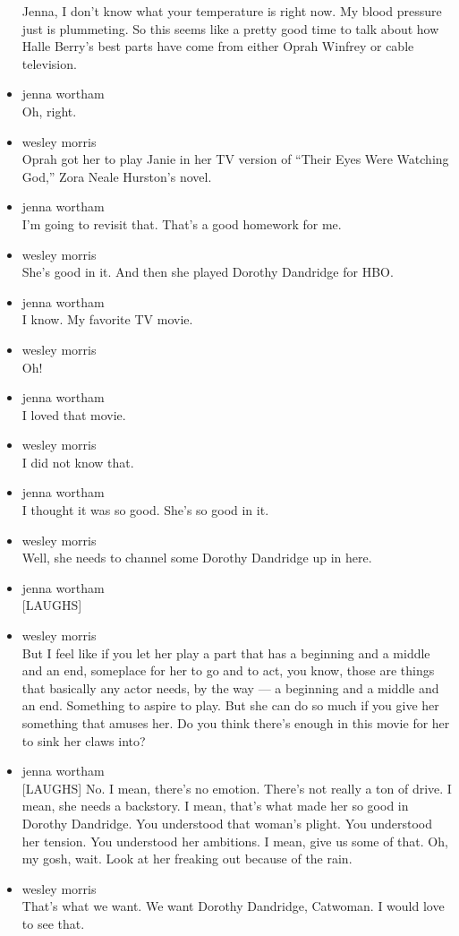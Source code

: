 \begin{itemize}
  Jenna, I don't know what your temperature is right now. My blood
  pressure just is plummeting. So this seems like a pretty good time to
  talk about how Halle Berry's best parts have come from either Oprah
  Winfrey or cable television.
\item
  jenna wortham\\
  Oh, right.
\item
  wesley morris\\
  Oprah got her to play Janie in her TV version of ``Their Eyes Were
  Watching God,'' Zora Neale Hurston's novel.
\item
  jenna wortham\\
  I'm going to revisit that. That's a good homework for me.
\item
  wesley morris\\
  She's good in it. And then she played Dorothy Dandridge for HBO.
\item
  jenna wortham\\
  I know. My favorite TV movie.
\item
  wesley morris\\
  Oh!
\item
  jenna wortham\\
  I loved that movie.
\item
  wesley morris\\
  I did not know that.
\item
  jenna wortham\\
  I thought it was so good. She's so good in it.
\item
  wesley morris\\
  Well, she needs to channel some Dorothy Dandridge up in here.
\item
  jenna wortham\\
  {[}LAUGHS{]}
\item
  wesley morris\\
  But I feel like if you let her play a part that has a beginning and a
  middle and an end, someplace for her to go and to act, you know, those
  are things that basically any actor needs, by the way --- a beginning
  and a middle and an end. Something to aspire to play. But she can do
  so much if you give her something that amuses her. Do you think
  there's enough in this movie for her to sink her claws into?
\item
  jenna wortham\\
  {[}LAUGHS{]} No. I mean, there's no emotion. There's not really a ton
  of drive. I mean, she needs a backstory. I mean, that's what made her
  so good in Dorothy Dandridge. You understood that woman's plight. You
  understood her tension. You understood her ambitions. I mean, give us
  some of that. Oh, my gosh, wait. Look at her freaking out because of
  the rain.
\item
  wesley morris\\
  That's what we want. We want Dorothy Dandridge, Catwoman. I would love
  to see that.


\end{itemize}
